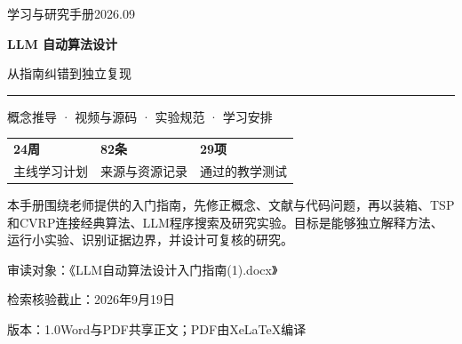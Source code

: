 \documentclass[UTF8,a4paper,11pt,fontset=none]{ctexart}
\begin{document}
\begin{titlepage}
\thispagestyle{empty}
{\sffamily\color{Accent}\large 学习与研究手册\hfill 2026.09}
\vspace{26mm}

{\sffamily\bfseries\color{Ink}\fontsize{32}{43}\selectfont LLM 自动算法设计\par}
\vspace{5mm}
{\sffamily\color{Ink}\fontsize{22}{31}\selectfont 从指南纠错到独立复现\par}
\vspace{9mm}
{\color{Accent}\rule{\textwidth}{1.3pt}}
\vspace{7mm}
{\large 概念推导 · 视频与源码 · 实验规范 · 学习安排\par}
\vspace{15mm}
\begin{tabular}{@{}p{}p{}p{}@{}}
{\sffamily\bfseries\Huge 24周} & {\sffamily\bfseries\Huge 82条} & {\sffamily\bfseries\Huge 29项}\\[4mm]
主线学习计划 & 来源与资源记录 & 通过的教学测试\\
\end{tabular}\par
\vspace{16mm}
本手册围绕老师提供的入门指南，先修正概念、文献与代码问题，再以装箱、TSP和CVRP连接经典算法、LLM程序搜索及研究实验。目标是能够独立解释方法、运行小实验、识别证据边界，并设计可复核的研究。
\vfill
{\sffamily\small 审读对象：《LLM自动算法设计入门指南(1).docx》\par}
{\sffamily\small 检索核验截止：2026年9月19日\par}
{\sffamily\small 版本：1.0\quad Word与PDF共享正文；PDF由XeLaTeX编译\par}
\end{titlepage}
\tableofcontents
\clearpage
{}


\end{document}

